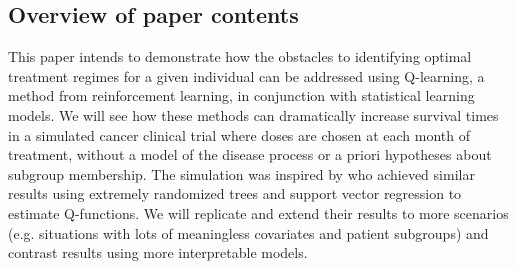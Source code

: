 \documentclass[12pt]{article}
\begin{document}
%
%
%
%


%
%
%




\subsection{Overview of paper contents} %
\label{sub:overview_of_contents}

This paper intends to demonstrate how the obstacles to identifying optimal treatment regimes for a given individual can be addressed using Q-learning, a method from reinforcement learning, in conjunction with statistical learning models. We will see how these methods can dramatically increase survival times in a simulated cancer clinical trial where doses are chosen at each month of treatment, without a model of the disease process or a priori hypotheses about subgroup membership. The simulation was inspired by \textcite{crt} who achieved similar results using extremely randomized trees and support vector regression to estimate Q-functions. We will replicate and extend their results to more scenarios (e.g. situations with lots of meaningless covariates and patient subgroups) and contrast results using more interpretable models.
\end{document}
